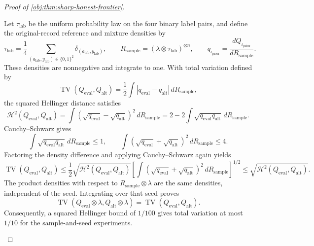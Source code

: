 \documentclass[11pt]{article}
\begin{document}
\begin{proof}[Proof of \cref{obj:thm:sharp-honest-frontier}]
\begin{enumerate}
Let \(\tau_{\mathrm{lab}}\) be the uniform probability law on the four binary
label pairs, and define the original-record reference and mixture densities by
\[
\tau_{\mathrm{lab}}
=\frac14\sum_{(a_{\mathrm{lab}},y_{\mathrm{lab}})\in\{0,1\}^2}
\delta_{(a_{\mathrm{lab}},y_{\mathrm{lab}})},
\qquad
R_{\mathrm{sample}}=(\lambda\otimes\tau_{\mathrm{lab}})^{\otimes n},
\qquad
q_{\iota_{\mathrm{prior}}}=\frac{dQ_{\iota_{\mathrm{prior}}}}{dR_{\mathrm{sample}}}.
\]
These densities are nonnegative and integrate to one. With total variation defined by
\[
\operatorname{TV}(Q_{\mathrm{eval}},Q_{\mathrm{alt}})
=
\frac12\int
|q_{\mathrm{eval}}-q_{\mathrm{alt}}|\,dR_{\mathrm{sample}},
\]
the squared Hellinger distance satisfies
\[
\mathcal H^2(Q_{\mathrm{eval}},Q_{\mathrm{alt}})
=
\int
(\sqrt{q_{\mathrm{eval}}}-\sqrt{q_{\mathrm{alt}}})^2\,dR_{\mathrm{sample}}
=
2-2\int\sqrt{q_{\mathrm{eval}}q_{\mathrm{alt}}}\,dR_{\mathrm{sample}}.
\]
Cauchy--Schwarz gives
\[
\int\sqrt{q_{\mathrm{eval}}q_{\mathrm{alt}}}\,dR_{\mathrm{sample}}\le1,
\qquad
\int(\sqrt{q_{\mathrm{eval}}}+\sqrt{q_{\mathrm{alt}}})^2
\,dR_{\mathrm{sample}}\le4.
\]
Factoring the density difference and applying Cauchy--Schwarz again yields
\[
\operatorname{TV}(Q_{\mathrm{eval}},Q_{\mathrm{alt}})
\le
\frac12
\sqrt{\mathcal H^2(Q_{\mathrm{eval}},Q_{\mathrm{alt}})}
\left[
\int(\sqrt{q_{\mathrm{eval}}}+\sqrt{q_{\mathrm{alt}}})^2
\,dR_{\mathrm{sample}}
\right]^{1/2}
\le
\sqrt{\mathcal H^2(Q_{\mathrm{eval}},Q_{\mathrm{alt}})}.
\]
The product densities with respect to
\(R_{\mathrm{sample}}\otimes\lambda\) are the same densities, independent of
the seed. Integrating over that seed proves
\[
\operatorname{TV}(Q_{\mathrm{eval}}\otimes\lambda,
Q_{\mathrm{alt}}\otimes\lambda)
=
\operatorname{TV}(Q_{\mathrm{eval}},Q_{\mathrm{alt}}).
\]
Consequently, a squared Hellinger bound of \(1/100\) gives total variation
at most \(1/10\) for the sample-and-seed experiments.


\end{enumerate}
\end{proof}
\end{document}
